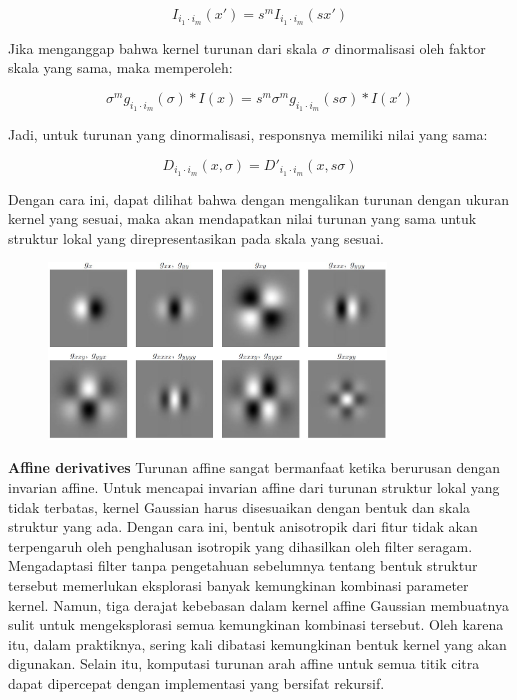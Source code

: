 \begin{equation*}
  I_{i_{1}\cdot i_{m}}(x') = s^{m}I_{i_{1}\cdot i_{m}}(sx')
\end{equation*}

Jika menganggap bahwa kernel turunan dari skala \(\sigma\) dinormalisasi oleh 
faktor skala yang sama, maka memperoleh:

\begin{equation*}
  \sigma^{m}g_{i_{1}\cdot i_{m}}(\sigma) * I(x)= s^{m}\sigma^{m}g_{i_{1}\cdot i_{m}}(s\sigma)*I(x')
\end{equation*}

Jadi, untuk turunan yang dinormalisasi, responsnya memiliki nilai yang sama:

\begin{equation*}
  D_{i_{1}\cdot i_{m}}(x,\sigma) = D'_{i_{1}\cdot i_{m}}(x,s\sigma)
\end{equation*}

Dengan cara ini, dapat dilihat bahwa dengan mengalikan turunan dengan ukuran kernel yang sesuai, 
maka akan mendapatkan nilai turunan yang sama untuk struktur lokal yang direpresentasikan pada skala yang sesuai.

\begin{figure}
  \centering{}
  \includegraphics[width=0.8\textwidth]{gambar/Uniform Gaussian derivatives.jpg}
  \caption{}
\end{figure}

\textbf{Affine derivatives} Turunan affine sangat bermanfaat ketika berurusan dengan invarian affine. 
Untuk mencapai invarian affine dari turunan struktur lokal yang tidak terbatas, 
kernel Gaussian harus disesuaikan dengan bentuk dan skala struktur yang ada. 
Dengan cara ini, bentuk anisotropik dari fitur tidak akan terpengaruh oleh penghalusan isotropik yang dihasilkan oleh filter seragam. 
Mengadaptasi filter tanpa pengetahuan sebelumnya tentang bentuk struktur tersebut memerlukan eksplorasi banyak kemungkinan kombinasi parameter kernel. 
Namun, tiga derajat kebebasan dalam kernel affine Gaussian membuatnya sulit untuk mengeksplorasi semua kemungkinan kombinasi tersebut. 
Oleh karena itu, dalam praktiknya, sering kali dibatasi kemungkinan bentuk kernel yang akan digunakan. 
Selain itu, komputasi turunan arah affine untuk semua titik citra dapat dipercepat dengan implementasi yang bersifat rekursif.

